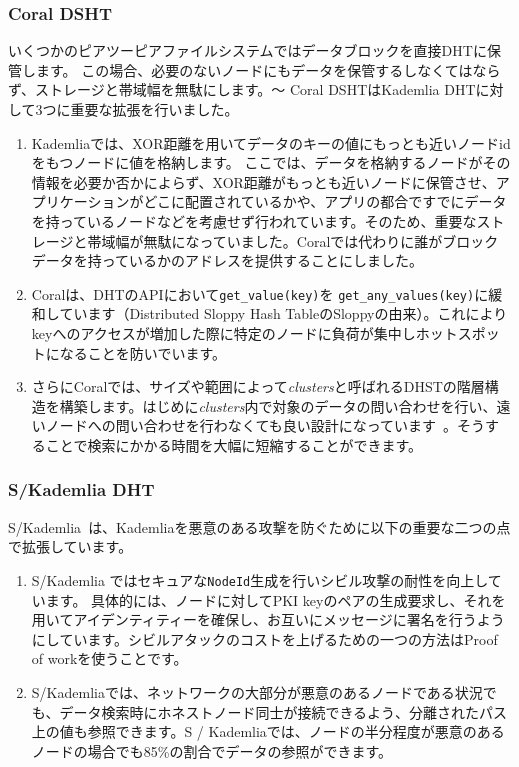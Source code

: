 \documentclass{sig-alternate}
\begin{document}
\subsubsection{Coral DSHT}
いくつかのピアツーピアファイルシステムではデータブロックを直接DHTに保管します。
この場合、必要のないノードにもデータを保管するしなくてはならず、ストレージと帯域幅を無駄にします。〜\cite {freedman04} Coral DSHTはKademlia DHTに対して3つに重要な拡張を行いました。
\begin{enumerate}

  \item Kademliaでは、XOR距離を用いてデータのキーの値にもっとも近いノードidをもつノードに値を格納します。 ここでは、データを格納するノードがその情報を必要か否かによらず、XOR距離がもっとも近いノードに保管させ、アプリケーションがどこに配置されているかや、アプリの都合ですでにデータを持っているノードなどを考慮せず行われています。そのため、重要なストレージと帯域幅が無駄になっていました。Coralでは代わりに誰がブロックデータを持っているかのアドレスを提供することにしました。
        

  \item Coralは、DHTのAPIにおいて\texttt{get\_value(key)}を
        \texttt{get\_any\_values(key)}に緩和しています（Distributed Sloppy Hash TableのSloppyの由来）。これによりkeyへのアクセスが増加した際に特定のノードに負荷が集中しホットスポットになることを防いでいます。

  \item さらにCoralでは、サイズや範囲によって\textit{clusters}と呼ばれるDHSTの階層構造を構築します。はじめに\textit{clusters}内で対象のデータの問い合わせを行い、遠いノードへの問い合わせを行わなくても良い設計になっています~\cite{freedman04}。そうすることで検索にかかる時間を大幅に短縮することができます。
\end{enumerate}

\subsubsection{S/Kademlia DHT}

S/Kademlia~\cite{baumgart07}は、Kademliaを悪意のある攻撃を防ぐために以下の重要な二つの点で拡張しています。
\begin{enumerate}

  \item S/Kademlia ではセキュアな\texttt{NodeId}生成を行いシビル攻撃の耐性を向上しています。
具体的には、ノードに対してPKI keyのペアの生成要求し、それを用いてアイデンティティーを確保し、お互いにメッセージに署名を行うようにしています。シビルアタックのコストを上げるための一つの方法はProof of workを使うことです。

  \item S/Kademliaでは、ネットワークの大部分が悪意のあるノードである状況でも、データ検索時にホネストノード同士が接続できるよう、分離されたパス上の値も参照できます。S / Kademliaでは、ノードの半分程度が悪意のあるノードの場合でも85\%の割合でデータの参照ができます。

\end{enumerate}
\end{document}
